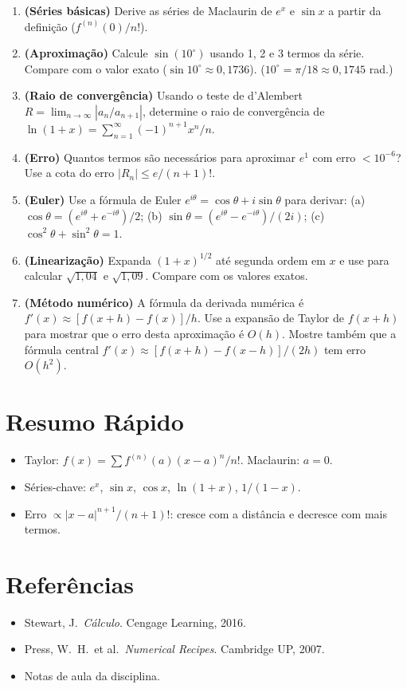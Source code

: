 \documentclass[12pt,a4paper]{article}
\begin{document}
\begin{enumerate}
  \item \textbf{(S\'eries b\'asicas)} Derive as s\'eries de Maclaurin de $e^x$ e $\sin x$ a partir da defini\c{c}\~ao ($f^{(n)}(0)/n!$).
  
  \item \textbf{(Aproxima\c{c}\~ao)} Calcule $\sin(10^\circ)$ usando 1, 2 e 3 termos da s\'erie. Compare com o valor exato ($\sin 10^\circ \approx 0{,}1736$). ($10^\circ = \pi/18 \approx 0{,}1745$ rad.)
  
  \item \textbf{(Raio de converg\^encia)} Usando o teste de d'Alembert $R = \lim_{n\to\infty}|a_n/a_{n+1}|$, determine o raio de converg\^encia de $\ln(1+x) = \sum_{n=1}^\infty (-1)^{n+1}x^n/n$.
  
  \item \textbf{(Erro)} Quantos termos s\~ao necess\'arios para aproximar $e^1$ com erro $< 10^{-6}$? Use a cota do erro $|R_n| \le e/(n+1)!$.
  
  \item \textbf{(Euler)} Use a f\'ormula de Euler $e^{i\theta} = \cos\theta + i\sin\theta$ para derivar: (a) $\cos\theta = (e^{i\theta}+e^{-i\theta})/2$; (b) $\sin\theta = (e^{i\theta}-e^{-i\theta})/(2i)$; (c) $\cos^2\theta + \sin^2\theta = 1$.
  
  \item \textbf{(Lineariza\c{c}\~ao)} Expanda $(1+x)^{1/2}$ at\'e segunda ordem em $x$ e use para calcular $\sqrt{1{,}04}$ e $\sqrt{1{,}09}$. Compare com os valores exatos.
  
  \item \textbf{(Método num\'erico)} A f\'ormula da derivada num\'erica \'e $f'(x) \approx [f(x+h) - f(x)]/h$. Use a expans\~ao de Taylor de $f(x+h)$ para mostrar que o erro desta aproxima\c{c}\~ao \'e $O(h)$. Mostre tamb\'em que a f\'ormula central $f'(x) \approx [f(x+h)-f(x-h)]/(2h)$ tem erro $O(h^2)$.
\end{enumerate}

\section*{Resumo R\'apido}
\begin{itemize}
  \item Taylor: $f(x) = \sum f^{(n)}(a)(x-a)^n/n!$. Maclaurin: $a=0$.
  \item S\'eries-chave: $e^x$, $\sin x$, $\cos x$, $\ln(1+x)$, $1/(1-x)$.
  \item Erro $\propto |x-a|^{n+1}/(n+1)!$: cresce com a dist\^ancia e decresce com mais termos.
\end{itemize}

\section*{Refer\^encias}
\begin{itemize}
  \item Stewart, J.\ \textit{C\'alculo}. Cengage Learning, 2016.
  \item Press, W.\ H.\ et al.\ \textit{Numerical Recipes}. Cambridge UP, 2007.
  \item Notas de aula da disciplina.
\end{itemize}
\end{document}
